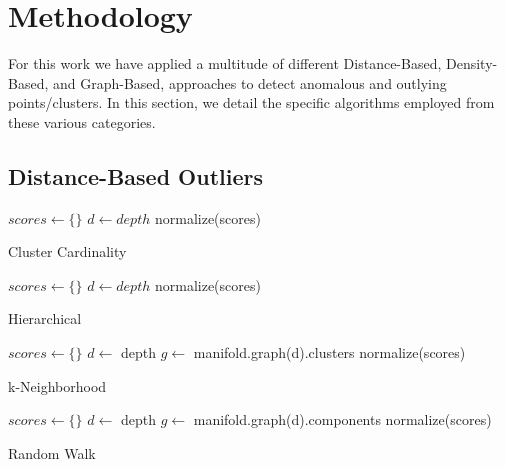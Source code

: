 \section{Methodology}
\label{sec:methodology}

For this work we have applied a multitude of different Distance-Based, Density-Based, and Graph-Based, approaches to detect anomalous and outlying points/clusters.
In this section, we detail the specific algorithms employed from these various categories.

\subsection{Distance-Based Outliers}

\begin{algorithm}
\DontPrintSemicolon
\SetAlgoLined
{}
 $scores \leftarrow \{\}$\;
 $d \leftarrow depth$\;
 normalize(scores)\;
 \caption{Cluster Cardinality}
 \label{alg-cc}
\end{algorithm}

\begin{algorithm}
\DontPrintSemicolon
\SetAlgoLined
{}
 $scores \leftarrow \{\}$\;
 $d \leftarrow depth$\;
 normalize(scores)\;
 \caption{Hierarchical}
 \label{alg-hierarchical}
\end{algorithm}


\begin{algorithm}
\DontPrintSemicolon
\SetAlgoLined
{}
 $scores \leftarrow \{\}$\;
 $d \leftarrow $ depth\;
 $g \leftarrow $ manifold.graph(d).clusters\;
 normalize(scores)\;
 \caption{k-Neighborhood}
 \label{alg-kneighborhood}
\end{algorithm}



\begin{algorithm}
\DontPrintSemicolon
\SetAlgoLined
{}
 $scores \leftarrow \{\}$\;
 $d \leftarrow $ depth\;
 $g \leftarrow $ manifold.graph(d).components\;
 normalize(scores)\;
 \caption{Random Walk}
 \label{alg-rw}
\end{algorithm}

